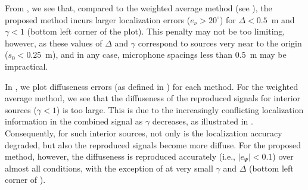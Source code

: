 From , we see that, compared to the weighted average method (see ), the proposed method incurs larger localization errors ($e_\nu > 20^\circ$) for $\Delta < 0.5$~m and $\gamma < 1$ (bottom left corner of the plot).
This penalty may not be too limiting, however, as these values of $\Delta$ and $\gamma$ correspond to sources very near to the origin ($s_0 < 0.25$~m), and in any case, microphone spacings less than $0.5$~m may be impractical.


In , we plot diffuseness errors (as defined in ) for each method.
For the weighted average method, we see that the diffuseness of the reproduced signals for interior sources ($\gamma < 1$) is too large.
This is due to the increasingly conflicting localization information in the combined signal as $\gamma$ decreases, as illustrated in .
Consequently, for such interior sources, not only is the localization accuracy degraded, but also the reproduced signals become more diffuse.
For the proposed method, however, the diffuseness is reproduced accurately (i.e., $|e_\Psi| < 0.1$) over almost all conditions, with the exception of at very small $\gamma$ and $\Delta$ (bottom left corner of ).

